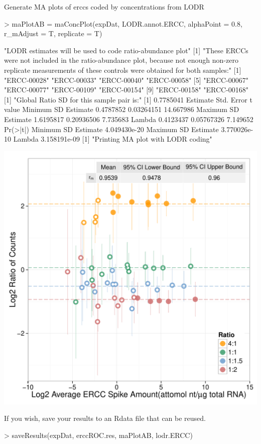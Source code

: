 \documentclass{article}
\begin{document}
Generate MA plots of erccs coded by concentrations from LODR
\begin{center}
\begin{Schunk}
\begin{Sinput}
> maPlotAB = maConcPlot(expDat, LODR.annot.ERCC, alphaPoint = 0.8, r_mAdjust = T, 
                        replicate = T)
\end{Sinput}
\begin{Soutput}
[1] "LODR estimates will be used to code ratio-abundance plot"
[1] "These ERCCs were not included in the ratio-abundance plot,  because not enough non-zero replicate measurements of these  controls were obtained for both samples:"
 [1] "ERCC-00028" "ERCC-00033" "ERCC-00040" "ERCC-00058"
 [5] "ERCC-00067" "ERCC-00077" "ERCC-00109" "ERCC-00154"
 [9] "ERCC-00158" "ERCC-00168"
[1] "Global Ratio SD for this sample pair is:"
[1] 0.7785041
                     Estimate Std. Error   t value
Minimum SD Estimate 0.4787852 0.03264151 14.667986
Maximum SD Estimate 1.6195817 0.20936506  7.735683
Lambda              0.4123437 0.05767326  7.149652
                        Pr(>|t|)
Minimum SD Estimate 4.049430e-20
Maximum SD Estimate 3.770026e-10
Lambda              3.158191e-09
[1] "Printing MA plot with LODR coding"
\end{Soutput}
\end{Schunk}
\includegraphics{erccdashboardVignette-maConcPlot}
\end{center}
If you wish, save your results to an Rdata file that can be reused.
\begin{Schunk}
\begin{Sinput}
> saveResults(expDat, erccROC.res, maPlotAB, lodr.ERCC)
\end{Sinput}
\end{Schunk}
\end{document}
